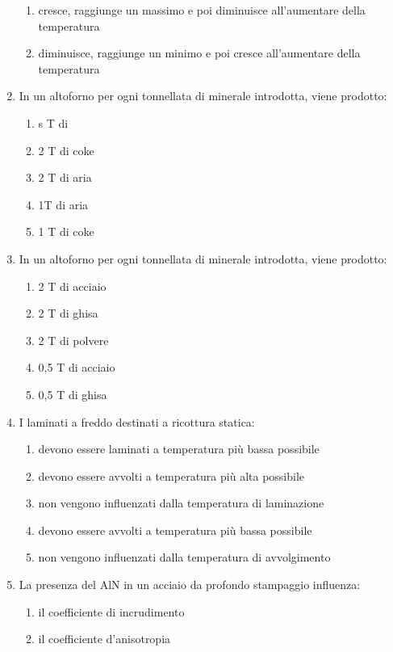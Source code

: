 \begin{enumerate}
\begin{enumerate}
        \item cresce, raggiunge un massimo e poi diminuisce all’aumentare della temperatura
        \item diminuisce, raggiunge un minimo e poi cresce all’aumentare della temperatura
    \end{enumerate}\item In un altoforno per ogni tonnellata di minerale introdotta, viene prodotto:
    \begin{enumerate}
        \item s T di 
        \item 2 T di coke
        \item 2 T di aria
        \item 1T di aria
        \item 1 T di coke
    \end{enumerate}
    \item In un altoforno per ogni tonnellata di minerale introdotta, viene prodotto:
    \begin{enumerate}
        \item 2 T di acciaio
        \item 2 T di ghisa
        \item 2 T di polvere
        \item 0,5 T di acciaio
        \item 0,5 T di ghisa
    \end{enumerate}
    \item I laminati a freddo destinati a ricottura statica:
    \begin{enumerate}
        \item devono essere laminati a temperatura più bassa possibile
        \item devono essere avvolti a temperatura più alta possibile
        \item non vengono influenzati dalla temperatura di laminazione
        \item devono essere avvolti a temperatura più bassa possibile
        \item non vengono influenzati dalla temperatura di avvolgimento
    \end{enumerate}
    \item La presenza del AlN in un acciaio da profondo stampaggio influenza:
    \begin{enumerate}
        \item il coefficiente di incrudimento
        \item il coefficiente d’anisotropia

\end{enumerate}
\end{enumerate}
